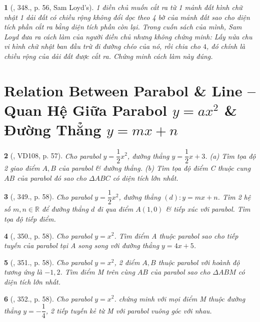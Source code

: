\documentclass{article}
\newtheorem{baitoan}{}
\begin{document}
\begin{baitoan}[\cite{Binh_Toan_9_tap_2}, 348., p. 56, Sam Loyd's]
	1 điền chủ muốn cắt ra từ 1 mảnh đất hình chữ nhật 1 dải đất có chiều rộng không đổi dọc theo 4 bờ của mảnh đất sao cho diện tích phần cắt ra bằng diện tích phần còn lại. Trong cuốn sách của mình, Sam Loyd đưa ra cách làm của người điền chủ nhưng không chứng minh: Lấy nửa chu vi hình chữ nhật ban đầu trừ đi đường chéo của nó, rồi chia cho $4$, đó chính là chiều rộng của dải đất được cắt ra. Chứng minh cách làm này đúng.
\end{baitoan}


\section{Relation Between Parabol \& Line -- Quan Hệ Giữa Parabol $y = ax^2$ \& Đường Thẳng $y = mx + n$}

\begin{baitoan}[\cite{Binh_Toan_9_tap_2}, VD108, p. 57]
	Cho parabol $y = \dfrac{1}{2}x^2$, đường thẳng $y = \dfrac{1}{2}x + 3$. (a) Tìm tọa độ 2 giao điểm $A,B$ của parabol \& đường thẳng. (b) Tìm tọa độ điểm C thuộc cung $AB$ của parabol đó sao cho $\Delta ABC$ có diện tích lớn nhất.
\end{baitoan}

\begin{baitoan}[\cite{Binh_Toan_9_tap_2}, 349., p. 58]
	Cho parabol $y = \dfrac{1}{2}x^2$, đường thẳng $(d):y = mx + n$. Tìm 2 hệ số $m,n\in\mathbb{R}$ để đường thẳng $d$ đi qua điểm $A(1,0)$ \& tiếp xúc với parabol. Tìm tọa độ tiếp điểm.
\end{baitoan}

\begin{baitoan}[\cite{Binh_Toan_9_tap_2}, 350., p. 58]
	Cho parabol $y = x^2$. Tìm điểm A thuộc parabol sao cho tiếp tuyến của parabol tại A song song với đường thẳng $y = 4x + 5$.
\end{baitoan}

\begin{baitoan}[\cite{Binh_Toan_9_tap_2}, 351., p. 58]
	Cho parabol $y = x^2$, 2 điểm $A,B$ thuộc parabol với hoành độ tương ứng là $-1,2$. Tìm điểm M trên cùng $AB$ của parabol sao cho $\Delta ABM$ có diện tích lớn nhất.
\end{baitoan}

\begin{baitoan}[\cite{Binh_Toan_9_tap_2}, 352., p. 58]
	Cho parabol $y = x^2$. chứng minh với mọi điểm M thuộc đường thẳng $y = -\dfrac{1}{4}$, 2 tiếp tuyến kẻ từ M với parabol vuông góc với nhau.
\end{baitoan}
\end{document}
